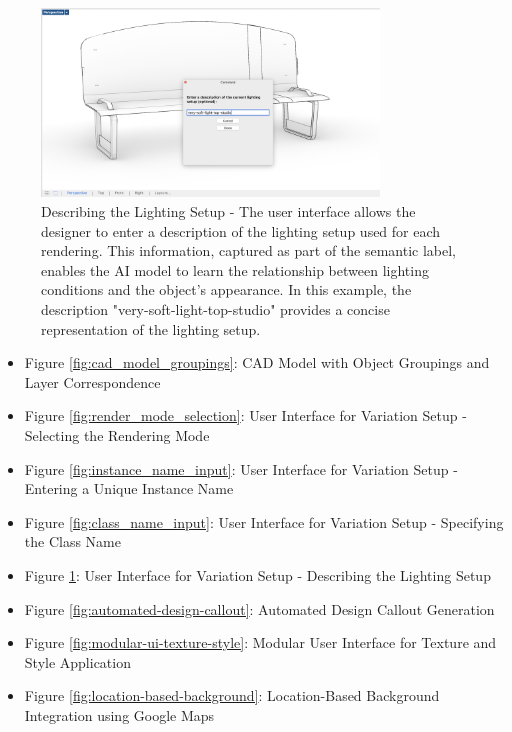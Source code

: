 \documentclass[12pt]{article}
\begin{document}
\begin{figure}[h]
    \centering
    \includegraphics[width=0.8\textwidth]{figures/figure-process-light-description-monochrome.jpg}
    \caption{Describing the Lighting Setup - The user interface allows the designer to enter a description of the lighting setup used for each rendering. This information, captured as part of the semantic label, enables the AI model to learn the relationship between lighting conditions and the object's appearance. In this example, the description "very-soft-light-top-studio" provides a concise representation of the lighting setup.}
    \label{fig:lighting_description_input}
\end{figure}





\begin{itemize}
    \item Figure \ref{fig:cad_model_groupings}: CAD Model with Object Groupings and Layer Correspondence
    \item Figure \ref{fig:render_mode_selection}: User Interface for Variation Setup - Selecting the Rendering Mode
    \item Figure \ref{fig:instance_name_input}: User Interface for Variation Setup - Entering a Unique Instance Name
    \item Figure \ref{fig:class_name_input}: User Interface for Variation Setup - Specifying the Class Name
    \item Figure \ref{fig:lighting_description_input}: User Interface for Variation Setup - Describing the Lighting Setup
    \item Figure \ref{fig:automated-design-callout}: Automated Design Callout Generation
    \item Figure \ref{fig:modular-ui-texture-style}: Modular User Interface for Texture and Style Application
    \item Figure \ref{fig:location-based-background}: Location-Based Background Integration using Google Maps
\end{itemize}
\end{document}
